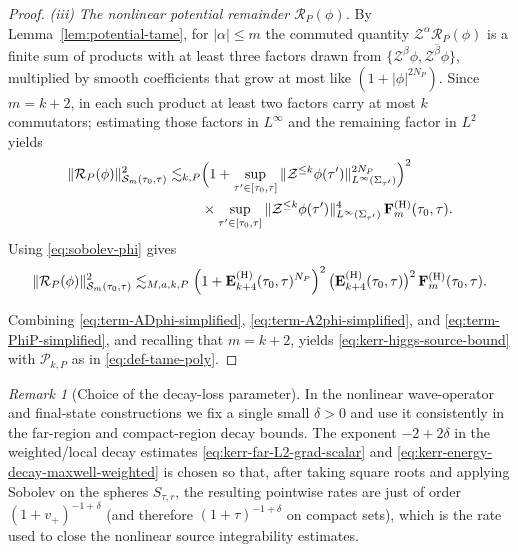 \documentclass[11pt]{article}
\numberwithin{equation}{section}
\theoremstyle{plain}
\theoremstyle{definition}
\theoremstyle{remark}
\newtheorem{remark}{Remark}[section]
\begin{document}
\begin{proof}
\smallskip\noindent
\emph{(iii) The nonlinear potential remainder $\mathcal R_P(\phi)$.}
By Lemma~\ref{lem:potential-tame}, for $|\alpha|\le m$ the commuted quantity $\mathcal Z^\alpha\mathcal R_P(\phi)$ is a finite sum of products with at least three factors drawn from $\{\mathcal Z^{\beta}\phi,\overline{\mathcal Z^{\beta}\phi}\}$, multiplied by smooth coefficients that grow at most like $(1+|\phi|^{2N_P})$.
Since $m=k+2$, in each such product at least two factors carry at most $k$ commutators; estimating those factors in $L^\infty$ and the remaining factor in $L^2$ yields
\begin{eqnarray}\label{eq:term-PhiP}
\|\mathcal R_P(\phi)\|_{\mathcal S_{m}(\tau_0,\tau)}^{2}
\lesssim_{k,P}
&\Bigl(1+\sup_{\tau'\in[\tau_0,\tau]}\|\mathcal Z^{\le k}\phi(\tau')\|_{L^\infty(\Sigma_{\tau'})}^{2N_P}\Bigr)^{2}\\
&\times
\sup_{\tau'\in[\tau_0,\tau]}\|\mathcal Z^{\le k}\phi(\tau')\|_{L^\infty(\Sigma_{\tau'})}^{4}\,
\mathbf F_{m}^{(\mathrm H)}(\tau_0,\tau).
\end{eqnarray}
Using \eqref{eq:sobolev-phi} gives
\begin{equation}\label{eq:term-PhiP-simplified}
\|\mathcal R_P(\phi)\|_{\mathcal S_{m}(\tau_0,\tau)}^{2}
\lesssim_{M,a,k,P}
\Bigl(1+\mathbf E_{k+4}^{(\mathrm H)}(\tau_0,\tau)^{N_P}\Bigr)^{2}\,
\bigl(\mathbf E_{k+4}^{(\mathrm H)}(\tau_0,\tau)\bigr)^{2}\,
\mathbf F_{m}^{(\mathrm H)}(\tau_0,\tau).
\end{equation}

\smallskip
Combining \eqref{eq:term-ADphi-simplified}, \eqref{eq:term-A2phi-simplified}, and \eqref{eq:term-PhiP-simplified}, and recalling that $m=k+2$, yields \eqref{eq:kerr-higgs-source-bound} with $\mathcal P_{k,P}$ as in \eqref{eq:def-tame-poly}.
\end{proof}



\begin{remark}[Choice of the decay-loss parameter]\label{rem:kerr-decay-delta}
In the nonlinear wave-operator and final-state constructions we fix a single small $\delta>0$ and use it consistently in the far-region and compact-region decay bounds.
The exponent $-2+2\delta$ in the weighted/local decay estimates \eqref{eq:kerr-far-L2-grad-scalar} and \eqref{eq:kerr-energy-decay-maxwell-weighted} is chosen so that, after taking square roots and applying Sobolev on the spheres $S_{\tau,r}$, the resulting pointwise rates are just of order $(1+v_{+})^{-1+\delta}$ (and therefore $(1+\tau)^{-1+\delta}$ on compact sets), which is the rate used to close the nonlinear source integrability estimates.
\end{remark}
\end{document}
